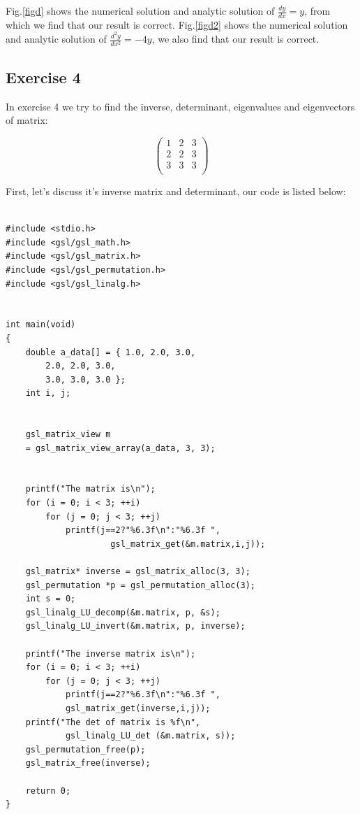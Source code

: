 \documentclass{article}
\begin{document}
Fig.\ref{figd} shows the numerical solution and analytic solution of $\frac{dy}{dx} = y$, from which we find that our result is correct. Fig.\ref{figd2} shows the numerical solution and analytic solution of $\frac{d^2y}{dx^2} = -4y$, we also find that our result is correct.

\subsection{Exercise 4}

In exercise 4 we try to find the inverse, determinant, eigenvalues and eigenvectors of matrix:

\begin{equation}       %
\left(                 %
  \begin{array}{ccc}   %
    1 & 2 & 3\\  %
    2 & 2 & 3\\  %
    3 & 3 & 3\\
  \end{array}
\right)                 %
\end{equation}

First, let's discuss it's inverse matrix and determinant, our code is listed below:
\begin{lstlisting}

#include <stdio.h>
#include <gsl/gsl_math.h>
#include <gsl/gsl_matrix.h>
#include <gsl/gsl_permutation.h>
#include <gsl/gsl_linalg.h>


int main(void)
{
    double a_data[] = { 1.0, 2.0, 3.0,
        2.0, 2.0, 3.0,
        3.0, 3.0, 3.0 };
    int i, j;
   
    
    gsl_matrix_view m
    = gsl_matrix_view_array(a_data, 3, 3);
    
    
    printf("The matrix is\n");
    for (i = 0; i < 3; ++i)
        for (j = 0; j < 3; ++j)
            printf(j==2?"%6.3f\n":"%6.3f ", 
                     gsl_matrix_get(&m.matrix,i,j));
    
    gsl_matrix* inverse = gsl_matrix_alloc(3, 3);
    gsl_permutation *p = gsl_permutation_alloc(3);
    int s = 0;
    gsl_linalg_LU_decomp(&m.matrix, p, &s);
    gsl_linalg_LU_invert(&m.matrix, p, inverse);
    
    printf("The inverse matrix is\n");
    for (i = 0; i < 3; ++i)
        for (j = 0; j < 3; ++j)
            printf(j==2?"%6.3f\n":"%6.3f ", 
            gsl_matrix_get(inverse,i,j));
    printf("The det of matrix is %f\n", 
            gsl_linalg_LU_det (&m.matrix, s));
    gsl_permutation_free(p);
    gsl_matrix_free(inverse);
   
    return 0;
}
\end{lstlisting}
\end{document}
